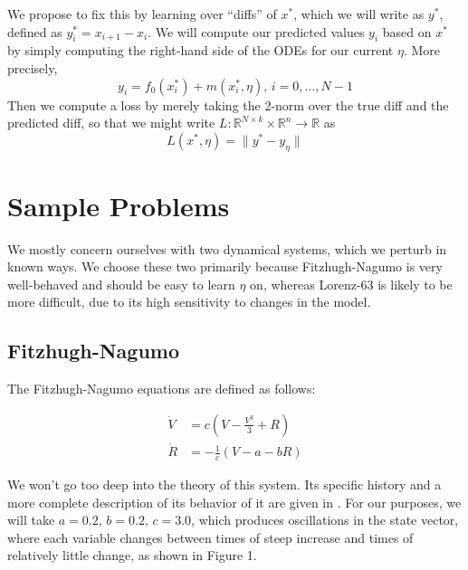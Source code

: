 \documentclass[12pt]{article}
\begin{document}
We propose to fix this by learning over ``diffs'' of $x^*$, which we will write as $y^*$, defined as $y^*_i = x_{i+1} - x_i$. We will compute our predicted values $y_i$ based on $x^*$ by simply computing the right-hand side of the ODEs for our current $\eta$. More precisely, $$y_i = f_0(x^*_i) + m(x^*_i, \eta),\, i=0,\ldots,N-1$$ Then we compute a loss by merely taking the 2-norm over the true diff and the predicted diff, so that we might write $L: \mathbb{R}^{N \times k} \times \mathbb{R}^n \to \mathbb{R}$ as $$L(x^*, \eta) = \| y^* - y_{\eta} \|$$








\section{Sample Problems}

We mostly concern ourselves with two dynamical systems, which we perturb in known ways. We choose these two primarily because Fitzhugh-Nagumo is very well-behaved and should be easy to learn $\eta$ on, whereas Lorenz-63 is likely to be more difficult, due to its high sensitivity to changes in the model.


\subsection{Fitzhugh-Nagumo}

The Fitzhugh-Nagumo equations are defined as follows:

\begin{align*}
  \dot{V} &= c \left(V - \frac{V^3}{3} + R \right)\\
  \dot{R} &= -\frac{1}{c} \left( V - a - b R \right)
\end{align*}

We won't go too deep into the theory of this system. Its specific history and a more complete description of its behavior of it are given in \cite{ramsay}. For our purposes, we will take $a=0.2,\, b=0.2,\, c=3.0$, which produces oscillations in the state vector, where each variable changes between times of steep increase and times of relatively little change, as shown in Figure 1.
\end{document}
